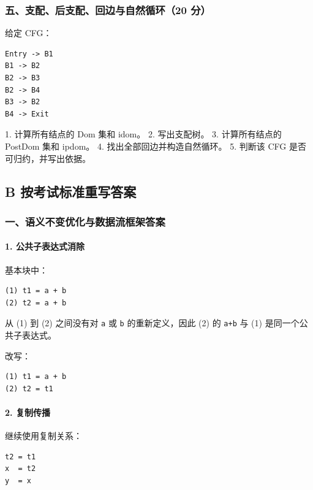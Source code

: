 \documentclass[UTF8]{ctexart}
\begin{document}
\subsubsection*{五、支配、后支配、回边与自然循环（20 分）}

给定 CFG：

\begin{Verbatim}[fontsize=\small,breaklines=true]
Entry -> B1
B1 -> B2
B2 -> B3
B2 -> B4
B3 -> B2
B4 -> Exit
\end{Verbatim}

1. 计算所有结点的 Dom 集和 idom。 2. 写出支配树。 3. 计算所有结点的 PostDom 集和 ipdom。 4. 找出全部回边并构造自然循环。 5. 判断该 CFG 是否可归约，并写出依据。

\subsection*{B 按考试标准重写答案}

\subsubsection*{一、语义不变优化与数据流框架答案}

\paragraph*{1. 公共子表达式消除}

基本块中：

\begin{Verbatim}[fontsize=\small,breaklines=true]
(1) t1 = a + b
(2) t2 = a + b
\end{Verbatim}

从 (1) 到 (2) 之间没有对 \texttt{a} 或 \texttt{b} 的重新定义，因此 (2) 的 \texttt{a+b} 与 (1) 是同一个公共子表达式。

改写：

\begin{Verbatim}[fontsize=\small,breaklines=true]
(1) t1 = a + b
(2) t2 = t1
\end{Verbatim}

\paragraph*{2. 复制传播}

继续使用复制关系：

\begin{Verbatim}[fontsize=\small,breaklines=true]
t2 = t1
x  = t2
y  = x
\end{Verbatim}
\end{document}
